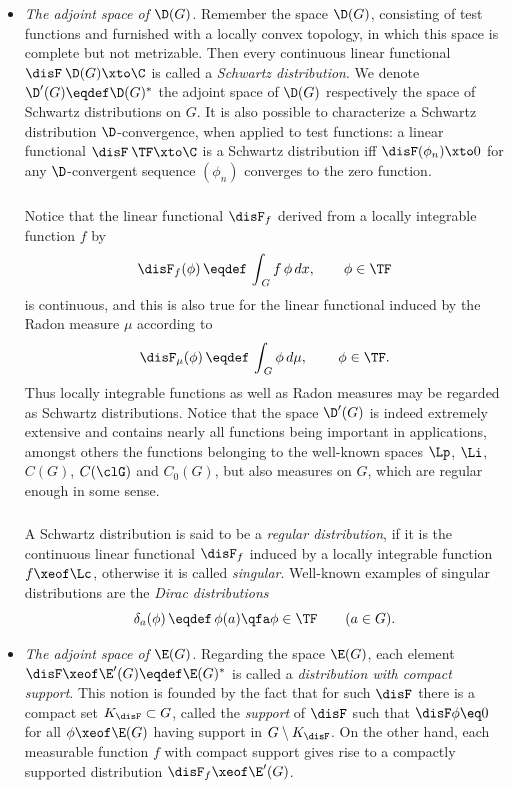 \documentclass[11pt,twoside]{article}
\def\G{G}
\begin{document}
\begin{itemize}[leftmargin=12pt,itemsep=5pt]
\item[1.] \textit{The adjoint space of $\D(\G)$.}
Remember the space $\D(\G)$,
consisting of test functions and furnished with a locally convex topology,
in which this space is complete but not metrizable.
Then every continuous linear functional $\disF\:\D(\G) \xto \C$ 
is called a \textit{Schwartz distribution}.
We denote $\D'(\G) \eqdef \D(\G)^*$ the adjoint space of $\D(\G)$
respectively the space of Schwartz distributions on $\G$.
It is also possible to characterize a Schwartz distribution
{\wrt} $\D$-convergence,
when applied to test functions:
a linear functional $\disF\:\TF \xto \C$
is a Schwartz distribution
iff $\disF(\phi_n) \xto 0$ for any $\D$-convergent sequence $(\phi_n)$
converges to the zero function.

\subparagraph{} %
Notice that the linear functional $\disF_f$
derived from a locally integrable function $f$ by
\[
\disF_f(\phi) \, \eqdef \, \int_{\,\G} f \, \phi \, dx,
\quad \quad \phi \in \TF
\]
is continuous,
and this is also true for the linear functional
induced by the Radon measure $\mu$ according to
\[
\disF_{\mu}(\phi) \, \eqdef \, \int_{\,\G} \phi \, d\mu,
\quad \quad \, \phi \in \TF.
\]
Thus locally integrable functions as well as Radon measures
may be regarded as Schwartz distributions.
Notice that the space $\D'(\G)$ is indeed extremely extensive
and contains nearly all functions being important in applications,
amongst others the functions belonging to the well-known spaces
$\Lp$, $\Li$, $C(\G)$, $C(\clG)$ and $C_0(\G)$,
but also measures on $\G$,
which are regular enough in some sense.

\subparagraph{}
A Schwartz distribution is said to be a \textit{regular distribution},
if it is the continuous linear functional $\disF_f$
induced by a locally integrable function $f \xeof \Lc$,
otherwise it is called \textit{singular}.
Well-known examples of singular distributions are
the \textit{Dirac distributions}
\[
\delta_a(\phi) \, \eqdef \, \phi(a)
\qfa \phi \in \TF
\quad \quad  (a \in \G).
\]

\item[2.] \textit{The adjoint space of $\E(\G)$.}
Regarding the {\FRECHET} space $\E(\G)$,
each element $\disF \xeof \E'(\G) \eqdef \E(\G)^*$ is called
a \textit{distribution with compact support}.
This notion is founded by the fact
that for such $\disF$ there is a compact set $K_{\disF} \subset \G$,
called the \textit{support} of $\disF$
such that
$\disF \phi \eq 0$ for all $\phi \xeof \E(\G)$
having support in $\G \setminus K_{\disF}$.
On the other hand,
each measurable function $f$ with compact support
gives rise to a compactly supported distribution $\disF_f \xeof \E'(\G)$.


\end{itemize}
\end{document}
